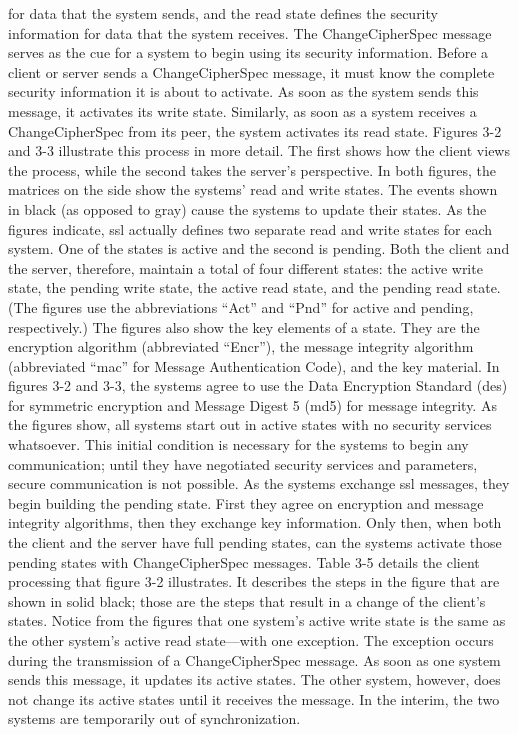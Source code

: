 for data that the system sends, and the read state defines the security
information for data that the system receives.
The ChangeCipherSpec message serves as the cue for a system to
begin using its security information. Before a client or server sends a
ChangeCipherSpec message, it must know the complete security information it is about to activate. As soon as the system sends this
message, it activates its write state. Similarly, as soon as a system receives a ChangeCipherSpec from its peer, the system activates its
read state. Figures 3-2 and 3-3 illustrate this process in more detail.
The first shows how the client views the process, while the second
takes the server’s perspective.
In both figures, the matrices on the side show the systems’ read and
write states. The events shown in black (as opposed to gray) cause
the systems to update their states. As the figures indicate, ssl actually
defines two separate read and write states for each system. One of
the states is active and the second is pending. Both the client and the
server, therefore, maintain a total of four different states: the active
write state, the pending write state, the active read state, and the
pending read state. (The figures use the abbreviations “Act” and
“Pnd” for active and pending, respectively.)
The figures also show the key elements of a state. They are the encryption algorithm (abbreviated “Encr”), the message integrity algorithm (abbreviated “mac” for Message Authentication Code), and
the key material. In figures 3-2 and 3-3, the systems agree to use the
Data Encryption Standard (des) for symmetric encryption and Message Digest 5 (md5) for message integrity.
As the figures show, all systems start out in active states with no security services whatsoever. This initial condition is necessary for the
systems to begin any communication; until they have negotiated security services and parameters, secure communication is not possible.
As the systems exchange ssl messages, they begin building the pending state. First they agree on encryption and message integrity algorithms, then they exchange key information. Only then, when both
the client and the server have full pending states, can the systems activate those pending states with ChangeCipherSpec messages.
Table 3-5 details the client processing that figure 3-2 illustrates. It describes the steps in the figure that are shown in solid black; those are
the steps that result in a change of the client’s states.
Notice from the figures that one system’s active write state is the
same as the other system’s active read state—with one exception. The
exception occurs during the transmission of a ChangeCipherSpec
message. As soon as one system sends this message, it updates its active states. The other system, however, does not change its active
states until it receives the message. In the interim, the two systems
are temporarily out of synchronization.

